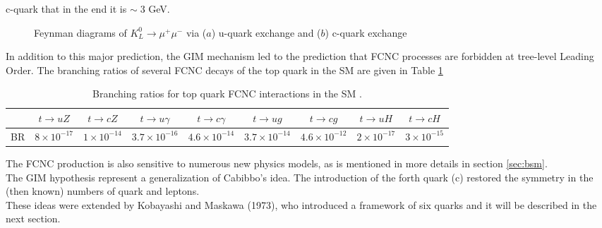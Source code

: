 c-quark that in the end it is $\sim\; 3$ GeV.
\begin{figure}[h]
	\centering
		\qquad
	\caption{Feynman diagrams of $K^{0}_{L}\rightarrow \mu^{+} \mu^{-}$ via ($a$) u-quark exchange and ($b$) c-quark exchange}
\end{figure}

In addition to this major prediction, the GIM mechanism led to the prediction that FCNC processes are forbidden at tree-level Leading Order. The branching ratios of several FCNC decays of the top quark in the SM are given in Table \ref{tab:SM_BR}
\begin{table}[h]
	\begin{adjustbox}{max width=1.\textwidth,center}
		\begin{tabular}{|c|c|c|c|c|c|c|c|c|}
		\hline 
  & $ t\rightarrow uZ$    & $ t\rightarrow cZ$    & $ t\rightarrow u\gamma$ & $ t\rightarrow c\gamma$ & $ t\rightarrow ug$       & $ t\rightarrow cg$       & $ t\rightarrow uH$     & $ t\rightarrow cH$  \\ 
	\hline 
	BR & $8\times 10^{-17} $ & $1\times 10^{-14} $ & $3.7\times 10^{-16} $       & $4.6\times 10^{-14} $      & $3.7\times 10^{-14} $  & $4.6\times 10^{-12} $ & $2\times 10^{-17} $  &$3\times 10^{-15} $  \\ 
		\hline 
		\end{tabular} 
	\end{adjustbox}
\caption{Branching ratios for top quark FCNC interactions in the SM \cite{aguilar}.}
\label{tab:SM_BR}
\end{table}
\noindent The FCNC production is also sensitive to numerous new physics models, as is mentioned in more details in section \ref{sec:bsm}.\\
The GIM hypothesis represent a generalization of Cabibbo's idea. The introduction of the forth quark (c) restored the symmetry
in the (then known)  numbers of quark and leptons.\\
These ideas were extended by Kobayashi and Maskawa (1973), who introduced a framework of six quarks and it will be described in the next section.

